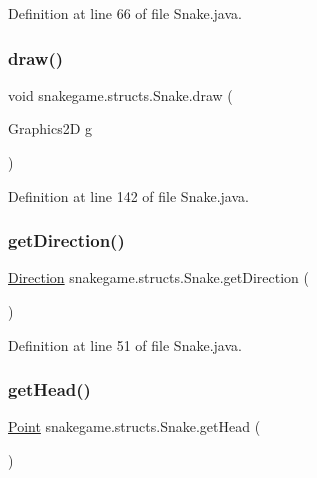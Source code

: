 Definition at line 66 of file Snake.\+java.

\mbox{\label{classsnakegame_1_1structs_1_1_snake_aefdd30421bce904e5585dbcbec258a98}} 
\subsubsection{\texorpdfstring{draw()}{draw()}}
{\footnotesize\ttfamily void snakegame.\+structs.\+Snake.\+draw (\begin{DoxyParamCaption}\item[{Graphics2D}]{g }\end{DoxyParamCaption})}



Definition at line 142 of file Snake.\+java.

\mbox{\label{classsnakegame_1_1structs_1_1_snake_a596ece3775ed531cef2fc023f339052e}} 
\subsubsection{\texorpdfstring{get\+Direction()}{getDirection()}}
{\footnotesize\ttfamily \mbox{\hyperlink{enumsnakegame_1_1structs_1_1_direction}{Direction}} snakegame.\+structs.\+Snake.\+get\+Direction (\begin{DoxyParamCaption}{ }\end{DoxyParamCaption})}



Definition at line 51 of file Snake.\+java.

\mbox{\label{classsnakegame_1_1structs_1_1_snake_a75d7bc3f6202e0159e79b703fdd5232c}} 
\subsubsection{\texorpdfstring{get\+Head()}{getHead()}}
{\footnotesize\ttfamily \mbox{\hyperlink{classsnakegame_1_1structs_1_1_point}{Point}} snakegame.\+structs.\+Snake.\+get\+Head (\begin{DoxyParamCaption}{ }\end{DoxyParamCaption})}



